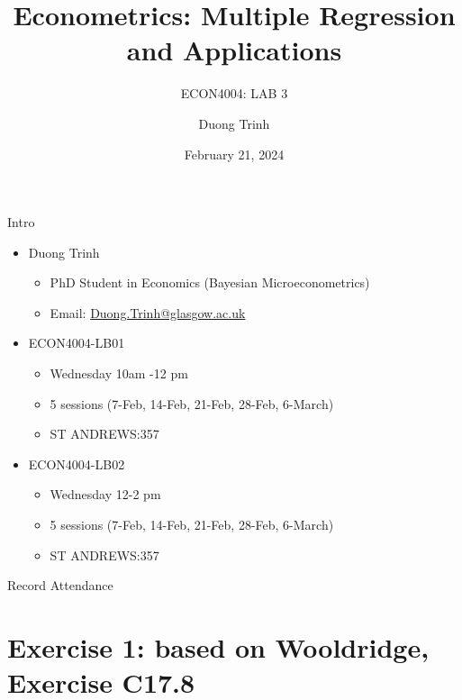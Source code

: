 \documentclass[
  10pt,
  ignorenonframetext,
]{beamer}
\title{Econometrics: Multiple Regression and Applications}
\subtitle{ECON4004: LAB 3}
\author{Duong Trinh}
\date{February 21, 2024}
\institute{University of Glasgow}
\providecommand{\tightlist}{%
  \setlength{\itemsep}{0pt}\setlength{\parskip}{0pt}}
\begin{document}
\frame{\titlepage}

\begin{frame}{Intro}
\protect\hypertarget{intro}{}
\begin{itemize}
\tightlist
\item
  Duong Trinh

  \begin{itemize}
  \tightlist
  \item
    PhD Student in Economics (Bayesian Microeconometrics)
  \item
    Email: \underline{Duong.Trinh@glasgow.ac.uk}
  \end{itemize}
\end{itemize}

\vspace{3mm}

\begin{itemize}
\tightlist
\item
  ECON4004-LB01

  \begin{itemize}
  \tightlist
  \item
    Wednesday 10am -12 pm
  \item
    5 sessions (7-Feb, 14-Feb, 21-Feb, 28-Feb, 6-March)
  \item
    ST ANDREWS:357
  \end{itemize}
\item
  ECON4004-LB02

  \begin{itemize}
  \tightlist
  \item
    Wednesday 12-2 pm
  \item
    5 sessions (7-Feb, 14-Feb, 21-Feb, 28-Feb, 6-March)
  \item
    ST ANDREWS:357
  \end{itemize}
\end{itemize}
\end{frame}

\begin{frame}{Record Attendance}
\protect\hypertarget{record-attendance}{}
\end{frame}

\hypertarget{exercise-1-based-on-wooldridge-exercise-c17.8}{%
\section{Exercise 1: based on Wooldridge, Exercise
C17.8}\label{exercise-1-based-on-wooldridge-exercise-c17.8}}
\end{document}
